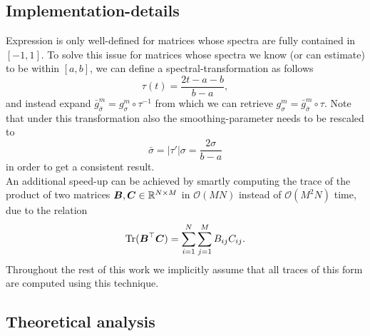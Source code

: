 
\subsection{Implementation-details}
\label{subsec:2-chebyshev-implementation-details}

Expression  is only well-defined for matrices whose spectra are fully
contained in $[-1, 1]$. To solve this issue for matrices whose spectra we know (or can estimate) to
be within $[a, b]$, we can define a \gls{spectral-transformation} as follows
\begin{equation}
    \tau(t) = \frac{2t - a - b}{b - a},
    \label{equ:2-chebyshev-spectral-transformation}
\end{equation}
and instead expand $\bar{g}_{\bar{\sigma}}^m = g_{\sigma}^m \circ \tau^{-1}$ 
from which we can retrieve $g_{\sigma}^m = \bar{g}_{\bar{\sigma}}^m \circ \tau$.
Note that under this transformation also the \gls{smoothing-parameter} needs to be
rescaled to
\begin{equation}
    \bar{\sigma} = |\tau'| \sigma = \frac{2\sigma}{b - a}
    \label{equ:2-chebyshev-sigma-transformation}
\end{equation}
in order to get a consistent result.\\

An additional speed-up can be achieved by smartly computing the trace of the 
product of two matrices $\boldsymbol{B}, \boldsymbol{C} \in \mathbb{R}^{N \times M}$ in
$\mathcal{O}(MN)$ instead of $\mathcal{O}(M^2N)$ time, due to the relation
\begin{equation}
    \operatorname{Tr}(\boldsymbol{B}^{\top}\boldsymbol{C}) = \sum_{i=1}^{N} \sum_{j=1}^{M} B_{ij} C_{ij}.
    \label{equ:2-chebyshev-fast-trace}
\end{equation}
Throughout the rest of this work we implicitly assume that all traces of this
form are computed using this technique.

\subsection{Theoretical analysis}
\label{subsec:2-chebyshev-theoretical-analysis}

